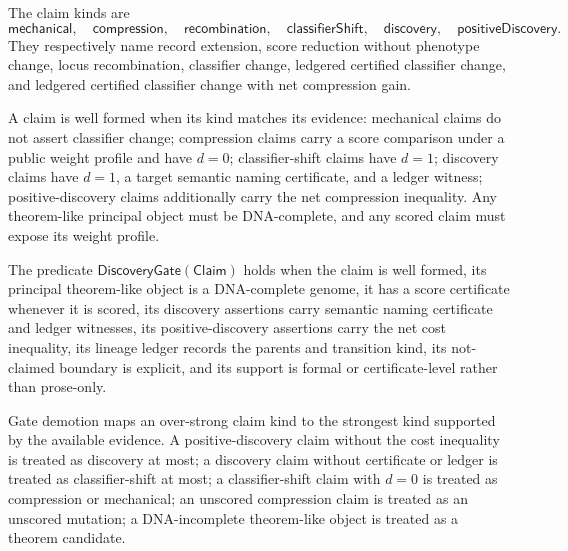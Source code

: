 \begin{definition}
\label{def:automated-discovery-claim-kinds}
The claim kinds are
$$
\mathsf{mechanical},\quad
\mathsf{compression},\quad
\mathsf{recombination},\quad
\mathsf{classifierShift},\quad
\mathsf{discovery},\quad
\mathsf{positiveDiscovery}.
$$
They respectively name record extension, score reduction without phenotype
change, locus recombination, classifier change, ledgered certified classifier
change, and ledgered certified classifier change with net compression gain.
\end{definition}

\begin{definition}
\label{def:automated-discovery-well-formed-claim}
A claim is well formed when its kind matches its evidence:
mechanical claims do not assert classifier change; compression claims carry a
score comparison under a public weight profile and have $d=0$; classifier-shift
claims have $d=1$; discovery claims have $d=1$, a target semantic naming
certificate, and a ledger witness; positive-discovery claims additionally
carry the net compression inequality. Any theorem-like principal object must
be DNA-complete, and any scored claim must expose its weight profile.
\end{definition}

\begin{definition}
\label{def:automated-discovery-gate}
The predicate $\mathsf{DiscoveryGate}(\mathsf{Claim})$ holds when the claim is
well formed, its principal theorem-like object is a DNA-complete genome, it
has a score certificate whenever it is scored, its discovery assertions carry
semantic naming certificate and ledger witnesses, its positive-discovery
assertions carry the net cost inequality, its lineage ledger records the
parents and transition kind, its not-claimed boundary is explicit, and its
support is formal or certificate-level rather than prose-only.
\end{definition}

\begin{definition}
\label{def:automated-discovery-gate-demotion}
Gate demotion maps an over-strong claim kind to the strongest kind supported by
the available evidence. A positive-discovery claim without the cost inequality
is treated as discovery at most; a discovery claim without certificate or
ledger is treated as classifier-shift at most; a classifier-shift claim with
$d=0$ is treated as compression or mechanical; an unscored compression claim is
treated as an unscored mutation; a DNA-incomplete theorem-like object is
treated as a theorem candidate.
\end{definition}

